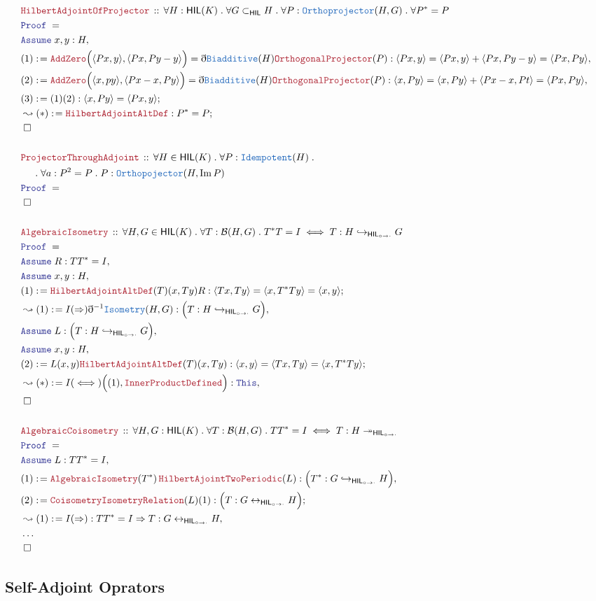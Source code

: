 \documentclass[12pt]{scrartcl}
\newcommand{\TYPE}[1]{\textcolor{NavyBlue}{\mathtt{#1}}}
\newcommand{\LOGIC}[1]{\textcolor{Blue}{\mathtt{#1}}}
\newcommand{\THM}[1]{\textcolor{Maroon}{\mathtt{#1}}}
\renewcommand{\.}{\; . \;}
\newcommand{\de}{: \kern 0.1pc =}
\newcommand{\Theorem}[2]{& \THM{#1} \, :: \, #2 \\ & \Proof = \\ }
\newcommand{\NewLine}{\\ & \kern 1pc}
\newcommand{\Page}[1]{\begin{align*} #1 \end{align*} \newpage   }
\newcommand{ \bd }{ \ByDef }
\newcommand{\NoProof}{ & \ldots \\ \EndProof}
\DeclareMathOperator*{\im}{Im}
\newcommand{\ToInj}{\hookrightarrow}
\newcommand{\ToSurj}{\twoheadrightarrow}
\newcommand{\ToBij}{\leftrightarrow}
\newcommand{\Say}[3]{& #1 \de #2 : #3, \\}
\newcommand{\Conclude}[3]{& #1 \de #2 : #3; \\}
\newcommand{\Derive}[3]{& \leadsto #1 \de #2 : #3, \\}
\newcommand{\DeriveConclude}[3]{& \leadsto #1 \de #2 : #3 ; \\}
\newcommand{\A}{\LOGIC{Assume} \;}
\newcommand{\Assume}[2]{& \A #1 : #2, \\}
\newcommand{\QED}{\; \square}
\newcommand{\EndProof}{& \QED \\}
\newcommand{\ByDef}{\eth}
\newcommand{\Proof}{\LOGIC{Proof} \; }
\newcommand{\HIL}{\mathsf{HIL}} %
\newcommand{\HILI}{\mathsf{HIL}_{\circ \to \cdot}}
\newcommand{\B}{\mathcal{B}}
\begin{document}
\Page{
	\Theorem{HilbertAdjointOfProjector}
	{
		\forall H : \HIL(K) \. 
		\forall G \subset_{\HIL} H \.
		\forall P : \TYPE{Orthoprojector}(H,G) \.
		\forall P^* = P
	}
	\Assume{x,y}{H}
	\Say{(1)}
	{
		\THM{AddZero}\Big( \langle P x, y \rangle, \langle Px, Py - y \rangle \Big) = 
		\bd \TYPE{Biadditive}(H)
		\THM{OrthogonalProjector}(P)
	}
	{
		\langle Px, y \rangle = 
		\langle Px, y \rangle + \langle Px, Py - y \rangle =
		\langle Px, Py \rangle
	}
	\Say{(2)}
	{ 
		\THM{AddZero}\Big( \langle  x, py \rangle, \langle Px - x, Py \rangle \Big) = 
		\bd \TYPE{Biadditive}(H)
		\THM{OrthogonalProjector}(P)
	}
	{
		\langle x, Py \rangle =
		\langle x, Py \rangle + \langle Px - x, Pt \rangle  =
		\langle Px, Py \rangle
	}
	\Conclude{(3)}
	{
		(1)(2)
	}
	{
		\langle x, Py \rangle = \langle Px, y \rangle 	
	}
	\DeriveConclude{(*)}{\THM{HilbertAdjointAltDef}}{P^* = P}
	\EndProof
	\\
	\Theorem{ProjectorThroughAdjoint}
	{
		\forall H \in \HIL(K) \.
		\forall P : \TYPE{Idempotent}(H) \.
		\NewLine \.
		\forall a : P^2 = P \.
		P : \TYPE{Orthopojector}(H, \im P)
	}
	\EndProof
	\\
	\Theorem{AlgebraicIsometry}
	{
		\forall H,G \in \HIL(K) \.  \forall T : \B(H,G) \. T^*T = I \iff T : H \ToInj_{\HILI} G 
	}
	\Assume{R}{TT^* = I }
	\Assume{x,y}{H}
	\Conclude{(1)}
	{
		\THM{HilbertAdjointAltDef}(T)(x,Ty)
		R
	}
	{
		\langle Tx, Ty \rangle =
		\langle x, T^*Ty \rangle =
		\langle x, y \rangle
	}
	\Derive{(1)}{I(\Rightarrow)\bd^{-1} \TYPE{Isometry}(H,G)}{\Big(T : H \ToInj_{\HILI} G \Big)}
	\Assume{L}{\Big(T : H \ToInj_{\HILI} G \Big)}
	\Assume{x,y}{H}
	\Conclude{(2) }
	{
		L(x,y) \THM{HilbertAdjointAltDef}(T)(x,Ty)
	}
	{
		\langle x, y \rangle =
		\langle Tx, Ty \rangle =
		\langle x, T^*Ty \rangle
	}
	\Derive{(*)}
	{I(\iff)\Big((1), \THM{InnerProductDefined} \Big) }
	{ \LOGIC{This} }
	\EndProof
	\\
	\Theorem{AlgebraicCoisometry}
	{ 
		\forall H,G : \HIL(K) \.
		\forall T : \B(H,G) \. 
		TT^* = I \iff
		T : H \ToSurj_{\HILI}
	}
	\Assume{L}{ TT^* = I }
	\Say{(1)}
	{
		\THM{AlgebraicIsometry}(T^*)\, 
		\THM{HilbertAjointTwoPeriodic}(L)
	}
	{
		\Big(T^* : G \ToInj_{\HILI} H\Big) 
	}
	\Conclude{(2)}
	{
		\THM{CoisometryIsometryRelation}(L)(1)	
	}
	{
		\Big(
			T : G \ToBij_{\HILI} H
		\Big)
	}
	\Derive{(1)}
	{I(\Rightarrow)}
	{ TT^* = I \Rightarrow T : G \ToBij_{\HILI} H }
	\NoProof
}
\subsection{Self-Adjoint Oprators}
\end{document}

